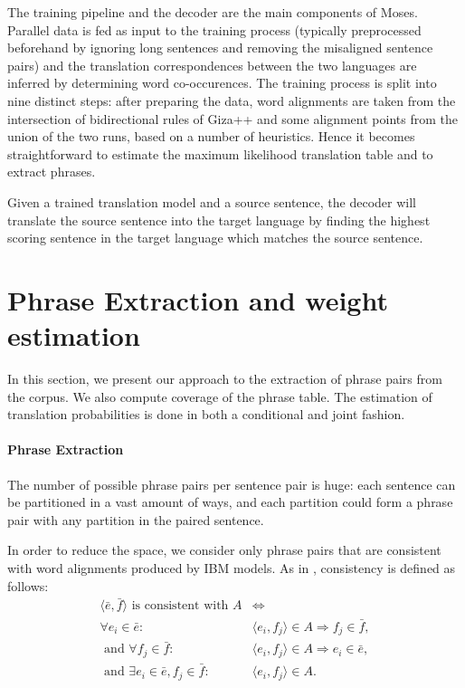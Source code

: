 \documentclass[11pt]{article}
\begin{document}
The training pipeline and the decoder are the main components of Moses. Parallel data is fed as input to the training process (typically preprocessed beforehand by ignoring long sentences and removing the misaligned sentence pairs) and the translation correspondences between the two languages are inferred by determining word co-occurences. The training process is split into nine distinct steps: after preparing the data, word alignments are taken from the intersection of bidirectional rules of Giza++ and some alignment points from the union of the two runs, based on a number of heuristics. Hence it becomes straightforward to estimate the maximum likelihood translation table and to extract phrases. 

Given a trained translation model and a source sentence, the decoder will translate the source sentence into the target language by finding the highest scoring sentence in the target language which matches the source sentence.


\section{Phrase Extraction and weight estimation}
\label{phraseExtraction}

In this section, we present our approach to the extraction of phrase pairs from the corpus. We also compute coverage of the phrase table. The estimation of translation probabilities is done in both a conditional and joint fashion.

\paragraph{Phrase Extraction}
The number of possible phrase pairs per sentence pair is huge: each sentence can be partitioned in a vast amount of ways, and each partition could form a phrase pair with any partition in the paired sentence. 

In order to reduce the space, we consider only phrase pairs that are consistent with word alignments produced by IBM models.
As in \cite{Koehn:2010}, consistency is defined as follows:
\begin{align*}
\langle \bar{e},\bar{f}\rangle\text{ is consistent with }A &\Leftrightarrow\\
\forall e_i\in \bar{e}: &\langle e_i,f_j\rangle \in A \Rightarrow f_j \in \bar{f}, \\
\text{ and }\forall f_j\in \bar{f}: &\langle e_i,f_j\rangle \in A \Rightarrow e_i \in \bar{e}, \\
\text{ and }\exists e_i \in \bar{e}, f_j\in \bar{f}: &\langle e_i,f_j\rangle \in A.\\
\end{align*}
\end{document}
